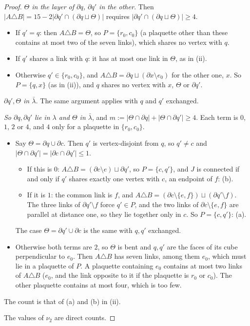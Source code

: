 \documentclass[11pt,a4paper]{article}
\theoremstyle{definition}
\theoremstyle{remark}
\begin{document}
\begin{proof}
\emph{$\Theta$ in the layer of $\partial q$, $\partial q'$ in the other.} Then $|A\triangle B|=15-2|\partial q'\cap(\partial q\sqcup\Theta)|$ requires $|\partial q'\cap(\partial q\sqcup\Theta)|\ge4$.
\begin{itemize}
\item If $q'=q$: then $A\triangle B=\Theta$, so $P=\{r_0,c_0\}$ (a plaquette other than these contains at most two of the seven links), which shares no vertex with $q$.
\item If $q'$ shares a link with $q$: it has at most one link in $\Theta$, as in (ii).
\item Otherwise $q'\in\{r_0,c_0\}$, and $A\triangle B=\partial q\sqcup(\partial x\setminus e_0)$ for the other one, $x$. So $P=\{q,x\}$ (as in (ii)), and $q$ shares no vertex with $x$, $\Theta$ or $\partial q'$.
\end{itemize}
\emph{$\partial q',\Theta$ in $\bar\lambda$.} The same argument applies with $q$ and $q'$ exchanged.

\emph{So $\partial q,\partial q'$ lie in $\lambda$ and $\Theta$ in $\bar\lambda$}, and $m:=|\Theta\cap\partial q|+|\Theta\cap\partial q'|\ge4$. Each term is $0$, $1$, $2$ or $4$, and $4$ only for a plaquette in
$\{r_0,c_0\}$.
\begin{itemize}
\item Say $\Theta=\partial q\cup\partial c$. Then $q'$ is vertex-disjoint from $q$, so $q'\ne c$ and $|\Theta\cap\partial q'|=|\partial c\cap\partial q'|\le1$.
\begin{itemize}
\item If this is $0$: $A\triangle B=(\partial c\setminus e)\sqcup\partial q'$, so $P=\{c,q'\}$, and $J$ is connected if and only if $q'$ shares exactly one vertex with $c$, an endpoint of $f$: (b).
\item If it is $1$: the common link is $f$, and $A\triangle B=(\partial c\setminus\{e,f\})\sqcup(\partial q'\setminus f)$. The three links of $\partial q'\setminus f$ force $q'\in P$, and
the two links of $\partial c\setminus\{e,f\}$ are parallel at distance one, so they lie together only in $c$. So $P=\{c,q'\}$: (a).
\end{itemize}
The case $\Theta=\partial q'\cup\partial c$ is the same with $q,q'$ exchanged.
\item Otherwise both terms are $2$, so $\Theta$ is bent and $q,q'$ are the faces of its cube perpendicular to $e_0$. Then $A\triangle B$ has seven links, among them $e_0$, which must lie in a
plaquette of $P$. A plaquette containing $e_0$ contains at most two links of $A\triangle B$ ($e_0$, and the link opposite to it if the plaquette is $r_0$ or $c_0$). The other plaquette
contains at most four, which is too few.
\end{itemize}
The count is that of (a) and (b) in (ii).

The values of $\nu_2$ are direct counts.
\end{proof}
\end{document}
